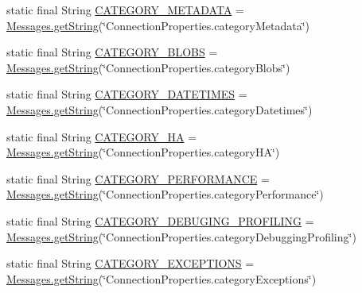 \begin{DoxyCompactItemize}
\item 
static final String \mbox{\hyperlink{classcom_1_1mysql_1_1cj_1_1conf_1_1_property_definitions_a55453f17ee9ffc5f96e1a3302f2f8f1f}{C\+A\+T\+E\+G\+O\+R\+Y\+\_\+\+M\+E\+T\+A\+D\+A\+TA}} = \mbox{\hyperlink{classcom_1_1mysql_1_1cj_1_1_messages_a86a388448aa7759254c491b3e1320d31}{Messages.\+get\+String}}(\char`\"{}Connection\+Properties.\+category\+Metadata\char`\"{})
\item 
static final String \mbox{\hyperlink{classcom_1_1mysql_1_1cj_1_1conf_1_1_property_definitions_a71ca3aca20fa6c4973a05bb58d172979}{C\+A\+T\+E\+G\+O\+R\+Y\+\_\+\+B\+L\+O\+BS}} = \mbox{\hyperlink{classcom_1_1mysql_1_1cj_1_1_messages_a86a388448aa7759254c491b3e1320d31}{Messages.\+get\+String}}(\char`\"{}Connection\+Properties.\+category\+Blobs\char`\"{})
\item 
static final String \mbox{\hyperlink{classcom_1_1mysql_1_1cj_1_1conf_1_1_property_definitions_aa6e6c41ab5b160bbbe01882f9dfb19ba}{C\+A\+T\+E\+G\+O\+R\+Y\+\_\+\+D\+A\+T\+E\+T\+I\+M\+ES}} = \mbox{\hyperlink{classcom_1_1mysql_1_1cj_1_1_messages_a86a388448aa7759254c491b3e1320d31}{Messages.\+get\+String}}(\char`\"{}Connection\+Properties.\+category\+Datetimes\char`\"{})
\item 
static final String \mbox{\hyperlink{classcom_1_1mysql_1_1cj_1_1conf_1_1_property_definitions_a072e10696f16c5e9f277da74963be2a4}{C\+A\+T\+E\+G\+O\+R\+Y\+\_\+\+HA}} = \mbox{\hyperlink{classcom_1_1mysql_1_1cj_1_1_messages_a86a388448aa7759254c491b3e1320d31}{Messages.\+get\+String}}(\char`\"{}Connection\+Properties.\+category\+HA\char`\"{})
\item 
static final String \mbox{\hyperlink{classcom_1_1mysql_1_1cj_1_1conf_1_1_property_definitions_a19a385c40b9724ccf30fbd27fbdf5d11}{C\+A\+T\+E\+G\+O\+R\+Y\+\_\+\+P\+E\+R\+F\+O\+R\+M\+A\+N\+CE}} = \mbox{\hyperlink{classcom_1_1mysql_1_1cj_1_1_messages_a86a388448aa7759254c491b3e1320d31}{Messages.\+get\+String}}(\char`\"{}Connection\+Properties.\+category\+Performance\char`\"{})
\item 
static final String \mbox{\hyperlink{classcom_1_1mysql_1_1cj_1_1conf_1_1_property_definitions_a5b61a7c85c4af74a0ddfb5638078f442}{C\+A\+T\+E\+G\+O\+R\+Y\+\_\+\+D\+E\+B\+U\+G\+I\+N\+G\+\_\+\+P\+R\+O\+F\+I\+L\+I\+NG}} = \mbox{\hyperlink{classcom_1_1mysql_1_1cj_1_1_messages_a86a388448aa7759254c491b3e1320d31}{Messages.\+get\+String}}(\char`\"{}Connection\+Properties.\+category\+Debugging\+Profiling\char`\"{})
\item 
static final String \mbox{\hyperlink{classcom_1_1mysql_1_1cj_1_1conf_1_1_property_definitions_a94e436e29bbeacdb09997bfccbda4c6c}{C\+A\+T\+E\+G\+O\+R\+Y\+\_\+\+E\+X\+C\+E\+P\+T\+I\+O\+NS}} = \mbox{\hyperlink{classcom_1_1mysql_1_1cj_1_1_messages_a86a388448aa7759254c491b3e1320d31}{Messages.\+get\+String}}(\char`\"{}Connection\+Properties.\+category\+Exceptions\char`\"{})

\end{DoxyCompactItemize}
